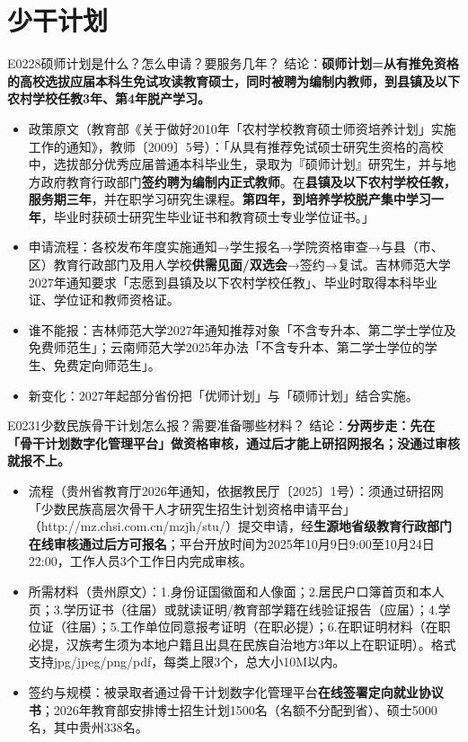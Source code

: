\section{少干计划}
\begin{qa}{E0228}{硕师计划是什么？怎么申请？要服务几年？}
结论：\textbf{硕师计划=从有推免资格的高校选拔应届本科生免试攻读教育硕士，同时被聘为编制内教师，到县镇及以下农村学校任教3年、第4年脱产学习。}
\begin{itemize}
  \item 政策原文（教育部《关于做好2010年「农村学校教育硕士师资培养计划」实施工作的通知》，教师〔2009〕5号）：「从具有推荐免试硕士研究生资格的高校中，选拔部分优秀应届普通本科毕业生，录取为『硕师计划』研究生，并与地方政府教育行政部门\textbf{签约聘为编制内正式教师}。在\textbf{县镇及以下农村学校任教，服务期三年}，并在职学习研究生课程。\textbf{第四年，到培养学校脱产集中学习一年}，毕业时获硕士研究生毕业证书和教育硕士专业学位证书。」
  \item 申请流程：各校发布年度实施通知→学生报名→学院资格审查→与县（市、区）教育行政部门及用人学校\textbf{供需见面/双选会}→签约→复试。吉林师范大学2027年通知要求「志愿到县镇及以下农村学校任教」、毕业时取得本科毕业证、学位证和教师资格证。
  \item 谁不能报：吉林师范大学2027年通知推荐对象「不含专升本、第二学士学位及免费师范生」；云南师范大学2025年办法「不含专升本、第二学士学位的学生、免费定向师范生」。
  \item 新变化：2027年起部分省份把「优师计划」与「硕师计划」结合实施。
\end{itemize}
\end{qa}

\begin{qa}{E0231}{少数民族骨干计划怎么报？需要准备哪些材料？}
结论：\textbf{分两步走：先在「骨干计划数字化管理平台」做资格审核，通过后才能上研招网报名；没通过审核就报不上。}
\begin{itemize}
  \item 流程（贵州省教育厅2026年通知，依据教民厅〔2025〕1号）：须通过研招网「少数民族高层次骨干人才研究生招生计划资格申请平台」（http://mz.chsi.com.cn/mzjh/stu/）提交申请，经\textbf{生源地省级教育行政部门在线审核通过后方可报名}；平台开放时间为2025年10月9日9:00至10月24日22:00，工作人员3个工作日内完成审核。
  \item 所需材料（贵州原文）：1.身份证国徽面和人像面；2.居民户口簿首页和本人页；3.学历证书（往届）或就读证明/教育部学籍在线验证报告（应届）；4.学位证（往届）；5.工作单位同意报考证明（在职必提）；6.在职证明材料（在职必提，汉族考生须为本地户籍且出具在民族自治地方3年以上在职证明）。格式支持jpg/jpeg/png/pdf，每类上限3个，总大小10M以内。
  \item 签约与规模：被录取者通过骨干计划数字化管理平台\textbf{在线签署定向就业协议书}；2026年教育部安排博士招生计划1500名（名额不分配到省）、硕士5000名，其中贵州338名。
\end{itemize}
\end{qa}

